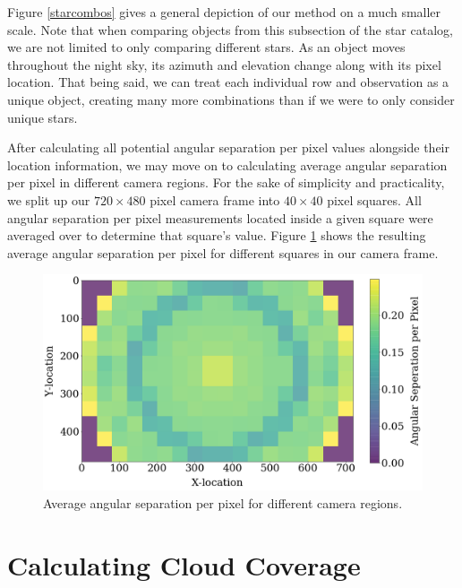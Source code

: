 Figure \ref{starcombos} gives a general depiction of our method on a much smaller scale.
Note that when comparing objects from this subsection of the star catalog, we are not limited to only comparing different stars.
As an object moves throughout the night sky, its azimuth and elevation change along with its pixel location.
That being said, we can treat each individual row and observation as a unique object, creating many more combinations than if we were to only consider unique stars.

After calculating all potential angular separation per pixel values alongside their location information, we may move on to calculating average angular separation per pixel in different camera regions.
For the sake of simplicity and practicality, we split up our $720 \times 480$ pixel camera frame into $40 \times 40$ pixel squares.  
All angular separation per pixel measurements located inside a given square were averaged over to determine that square's value.
Figure \ref{colorful} shows the resulting average angular separation per pixel for different squares in our camera frame.

\begin{figure}[ht!]
  \centering
  \includegraphics[scale=0.35]{images/boxes_colored.png}
  \caption{Average angular separation per pixel for different camera regions.}
  \label{colorful}
\end{figure}


\section{Calculating Cloud Coverage}

